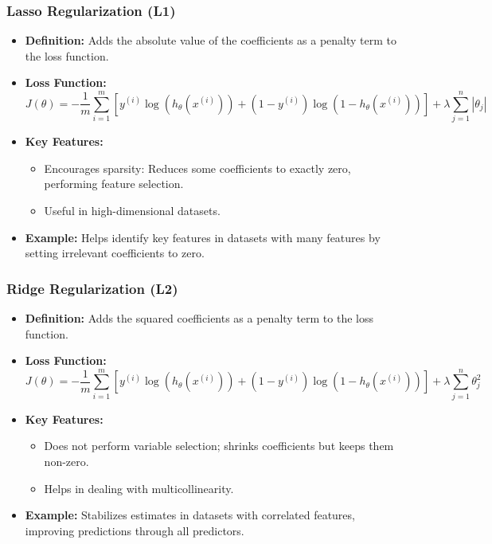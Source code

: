 \documentclass[aspectratio=169]{beamer}
\begin{document}
\begin{frame}[fragile]
    \frametitle{Lasso Regularization (L1)}
    \begin{itemize}
        \item \textbf{Definition:} Adds the absolute value of the coefficients as a penalty term to the loss function.
        \item \textbf{Loss Function:} 
        \begin{equation}
            J(\theta) = -\frac{1}{m} \sum_{i=1}^{m} [y^{(i)} \log(h_\theta(x^{(i)})) + (1 - y^{(i)}) \log(1 - h_\theta(x^{(i)}))] + \lambda \sum_{j=1}^{n} |\theta_j|
        \end{equation}
        \item \textbf{Key Features:}
        \begin{itemize}
            \item Encourages sparsity: Reduces some coefficients to exactly zero, performing feature selection.
            \item Useful in high-dimensional datasets.
        \end{itemize}
        \item \textbf{Example:} Helps identify key features in datasets with many features by setting irrelevant coefficients to zero.
    \end{itemize}
\end{frame}

\begin{frame}[fragile]
    \frametitle{Ridge Regularization (L2)}
    \begin{itemize}
        \item \textbf{Definition:} Adds the squared coefficients as a penalty term to the loss function.
        \item \textbf{Loss Function:} 
        \begin{equation}
            J(\theta) = -\frac{1}{m} \sum_{i=1}^{m} [y^{(i)} \log(h_\theta(x^{(i)})) + (1 - y^{(i)}) \log(1 - h_\theta(x^{(i)}))] + \lambda \sum_{j=1}^{n} \theta_j^2
        \end{equation}
        \item \textbf{Key Features:}
        \begin{itemize}
            \item Does not perform variable selection; shrinks coefficients but keeps them non-zero.
            \item Helps in dealing with multicollinearity.
        \end{itemize}
        \item \textbf{Example:} Stabilizes estimates in datasets with correlated features, improving predictions through all predictors.
    \end{itemize}
\end{frame}
\end{document}
